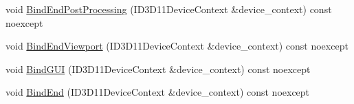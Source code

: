 \begin{DoxyCompactItemize}
\item 
void \mbox{\hyperlink{classmage_1_1rendering_1_1_output_manager_a47e4a5dfc0bca82c49ebde85e01d55cc}{Bind\+End\+Post\+Processing}} (I\+D3\+D11\+Device\+Context \&device\+\_\+context) const noexcept
\item 
void \mbox{\hyperlink{classmage_1_1rendering_1_1_output_manager_a1b99009331167e4548dbb58695926542}{Bind\+End\+Viewport}} (I\+D3\+D11\+Device\+Context \&device\+\_\+context) const noexcept
\item 
void \mbox{\hyperlink{classmage_1_1rendering_1_1_output_manager_a08be9cc8922f891c8ea4f17559ee40db}{Bind\+G\+UI}} (I\+D3\+D11\+Device\+Context \&device\+\_\+context) const noexcept
\item 
void \mbox{\hyperlink{classmage_1_1rendering_1_1_output_manager_adf8fa859bb168ecf389d56b574a69dbd}{Bind\+End}} (I\+D3\+D11\+Device\+Context \&device\+\_\+context) const noexcept
\end{DoxyCompactItemize}
